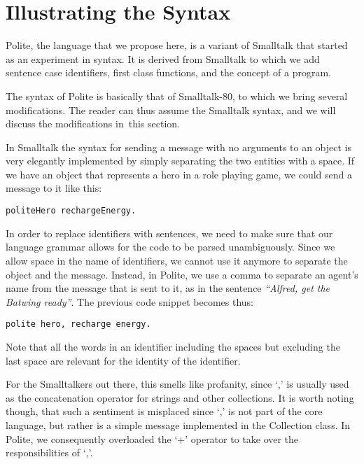
\section{Illustrating the Syntax}

Polite, the language that we propose here, is a variant of Smalltalk that started as an experiment in syntax. It is derived from Smalltalk to which we add sentence case identifiers, first class functions, and the concept of a program. 

The syntax of Polite is basically that of Smalltalk-80\cite{Gold83a}, to which we bring several modifications. The reader can thus assume the Smalltalk syntax, and we will discuss the modifications in this section. 

In Smalltalk the syntax for sending a message with no arguments to an object is very elegantly implemented by simply separating the two entities with a space. If we have an object that represents a hero in a role playing game, we could send a message to it like this: 

\begin{verbatim} 
politeHero rechargeEnergy.
\end{verbatim} 

In order to replace identifiers with sentences, we need to make sure that our language grammar allows for the code to be parsed unambiguously. Since we allow space in the name of identifiers, we cannot use it anymore to separate the object and the message. Instead, in Polite, we use a comma to separate an agent’s name from the message that is sent to it, as in the sentence {\em ``Alfred, get the Batwing ready''}. The previous code snippet becomes thus: 

\begin{verbatim} 
polite hero, recharge energy. 
\end{verbatim}

Note that all the words in an identifier including the spaces but excluding the last space are relevant for the identity of the identifier.

For the Smalltalkers out there, this smells like profanity, since `,’ is usually used as the concatenation operator for strings and other collections. It is worth noting though, that such a sentiment is misplaced since `,’ is not part of the core language, but rather is a simple message implemented in the Collection class. In Polite, we consequently overloaded the `+’ operator to take over the responsibilities of `,’.

